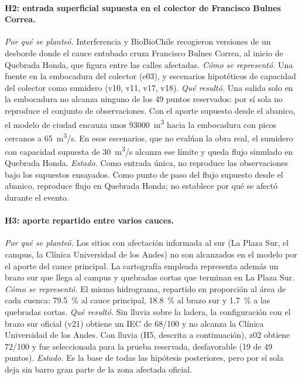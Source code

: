 \paragraph{H2: entrada superficial supuesta en el colector de Francisco Bulnes Correa.} \emph{Por qué se planteó.} Interferencia y BioBioChile recogieron versiones de un desborde donde el cauce entubado cruza Francisco Bulnes Correa, al inicio de Quebrada Honda, que figura entre las calles afectadas. \emph{Cómo se representó.} Una fuente en la embocadura del colector (e03), y escenarios hipotéticos de capacidad del colector como sumidero (v10, v11, v17, v18). \emph{Qué resultó.} Una salida solo en la embocadura no alcanza ninguno de los 49 puntos reservados: por sí sola no reproduce el conjunto de observaciones. Con el aporte supuesto desde el abanico, el modelo de ciudad encauza unos \SI{93000}{m^3} hacia la embocadura con picos cercanos a \SI{65}{m^3/s}. En esos escenarios, que no evalúan la obra real, el sumidero con capacidad supuesta de \SI{30}{m^3/s} alcanza ese límite y queda flujo simulado en Quebrada Honda. \emph{Estado.} Como entrada única, no reproduce las observaciones bajo los supuestos ensayados. Como punto de paso del flujo supuesto desde el abanico, reproduce flujo en Quebrada Honda; no establece por qué se afectó durante el evento.

\paragraph{H3: aporte repartido entre varios cauces.} \emph{Por qué se planteó.} Los sitios con afectación informada al sur (La Plaza Sur, el campus, la Clínica Universidad de los Andes) no son alcanzados en el modelo por el aporte del cauce principal. La cartografía empleada representa además un brazo sur que llega al campus y quebradas cortas que terminan en La Plaza Sur. \emph{Cómo se representó.} El mismo hidrograma, repartido en proporción al área de cada cuenca: \SI{79,5}{\percent} al cauce principal, \SI{18,8}{\percent} al brazo sur y \SI{1,7}{\percent} a las quebradas cortas. \emph{Qué resultó.} Sin lluvia sobre la ladera, la configuración con el brazo sur oficial (v21) obtiene un IEC de 68/100 y no alcanza la Clínica Universidad de los Andes. Con lluvia (H5, descrita a continuación), z02 obtiene 72/100 y fue seleccionada para la prueba reservada, desfavorable (19 de 49 puntos). \emph{Estado.} Es la base de todas las hipótesis posteriores, pero por sí sola deja sin barro gran parte de la zona afectada oficial.

